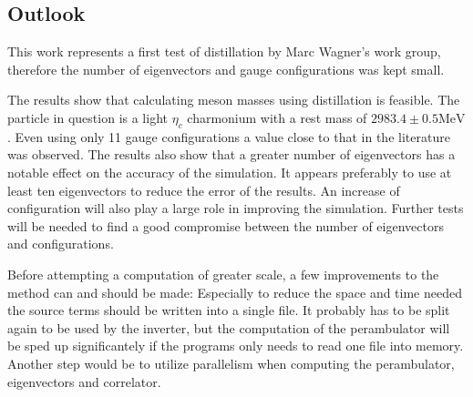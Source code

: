 \subsection{Outlook}

This work represents a first test of distillation by Marc Wagner's work group, therefore the number of eigenvectors and gauge configurations was kept small.

The results show that calculating meson masses using distillation is feasible. The particle in question is a light $\eta_c$ charmonium with a rest mass of $2983.4 \pm 0.5 \text{MeV}$ \cite{pdglive}. Even using only 11 gauge configurations a value close to that in the literature was observed. The results also show that a greater number of eigenvectors has a notable effect on the accuracy of the simulation. It appears preferably to use at least ten eigenvectors to reduce the error of the results. An increase of configuration will also play a large role in improving the simulation. Further tests will be needed to find a good compromise between the number of eigenvectors and configurations.

Before attempting a computation of greater scale, a few improvements to the method can and should be made: Especially to reduce the space and time needed the source terms should be written into a single file. It probably has to be split again to be used by the inverter, but the computation of the perambulator will be sped up significantely if the programs only needs to read one file into memory. Another step would be to utilize parallelism when computing the perambulator, eigenvectors and correlator.